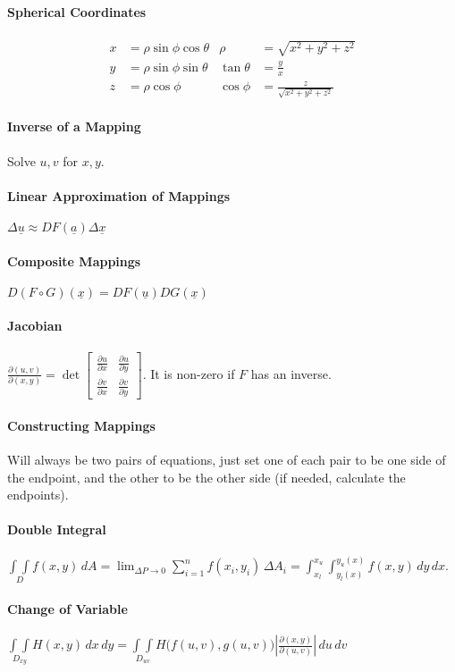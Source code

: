 \documentclass[10pt,letter]{article}
\theoremstyle{plain}
\theoremstyle{definition}
\begin{document}
\paragraph{Spherical Coordinates} \begin{align*}x&=\rho\sin\phi\cos\theta&\rho&=\sqrt{x^2+y^2+z^2}\\y&=\rho\sin\phi\sin\theta&\tan\theta&=\frac{y}{x}\\z&=\rho\cos\phi&\cos\phi&=\frac{z}{\sqrt{x^2+y^2+z^2}}\end{align*}
\paragraph{Inverse of a Mapping} Solve $u,v$ for $x,y$. 
\paragraph{Linear Approximation of Mappings} $\Delta\underline{u}\approx DF(\underline{a})\Delta\underline{x}$
\paragraph{Composite Mappings} $D(F\circ G)(\underline{x})=DF(\underline{u})DG(\underline{x})$
\paragraph{Jacobian} $\frac{\partial(u,v)}{\partial(x,y)}=\det\begin{bmatrix}\frac{\partial u}{\partial x}&\frac{\partial u}{\partial y}\\\frac{\partial v}{\partial x}&\frac{\partial v}{\partial y}\end{bmatrix}$. It is non-zero if $F$ has an inverse. 
\paragraph{Constructing Mappings} Will always be two pairs of equations, just set one of each pair to be one side of the endpoint, and the other to be the other side (if needed, calculate the endpoints).
\paragraph{Double Integral} $\underset{D}{\int\int}f(x,y)\,dA=\lim_{\Delta P\rightarrow0}\sum_{i=1}^nf(x_i,y_i)\,\Delta A_i=\int_{x_l}^{x_u}\int_{y_l(x)}^{y_u(x)}f(x,y)\,dy\,dx$. 
\paragraph{Change of Variable} $\underset{D_{xy}}{\int\int}H(x,y)\,dx\,dy=\underset{D_{uv}}{\int\int}H\big(f(u,v),g(u,v)\big)\left|\frac{\partial(x,y)}{\partial(u,v)}\right|\,du\,dv$
\end{document}
